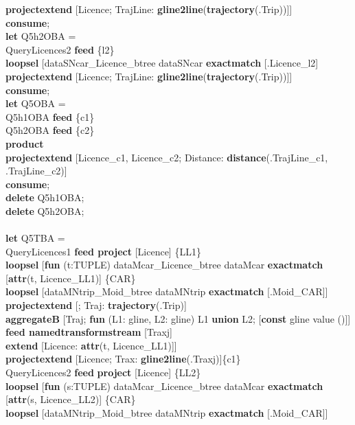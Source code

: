 \documentclass[a4paper]{article}
\newcommand{\op}[1]{\textbf{#1}}
\begin{document}
\begin{scriptsize}
\begin{tabbing}
\>\>\op{projectextend} [Licence; TrajLine: \op{gline2line}(\op{trajectory}(.Trip))]]\\
\op{consume};\\
\op{let} Q5h2OBA =\\
\>QueryLicences2 \op{feed} \{l2\}\\
\>\op{loopsel} [dataSNcar\_Licence\_btree dataSNcar \op{exactmatch} [.Licence\_l2]\\
\>\>\op{projectextend} [Licence; TrajLine: \op{gline2line}(\op{trajectory}(.Trip))]]\\
\op{consume};\\
\op{let} Q5OBA =\\
\>Q5h1OBA \op{feed} \{c1\}\\
\>Q5h2OBA \op{feed} \{c2\}\\
\>\op{product}\\
\>\op{projectextend} [Licence\_c1, Licence\_c2; Distance: \op{distance}(.TrajLine\_c1, .TrajLine\_c2)]\\
\op{consume};\\
\op{delete} Q5h1OBA;\\
\op{delete} Q5h2OBA;\\
\\
\op{let} Q5TBA =\\
\>QueryLicences1 \op{feed project} [Licence] \{LL1\}\\
\>\>\op{loopsel} [\op{fun} (t:TUPLE) dataMcar\_Licence\_btree dataMcar \op{exactmatch} [\op{attr}(t, Licence\_LL1)] \{CAR\}\\
\>\>\>\op{loopsel} [dataMNtrip\_Moid\_btree dataMNtrip \op{exactmatch} [.Moid\_CAR]]\\
\>\>\>\op{projectextend}  [; Traj: \op{trajectory}(.Trip)]\\
\>\>\>\op{aggregateB} [Traj; \op{fun} (L1: gline, L2: gline) L1 \op{union} L2; [\op{const} gline value ()]]\\
\>\>\>\op{feed namedtransformstream} [Traxj]\\
\>\>\>\op{extend} [Licence: \op{attr}(t, Licence\_LL1)]]\\
\>\>\op{projectextend} [Licence; Trax: \op{gline2line}(.Traxj)]\{c1\}\\
\>QueryLicences2 \op{feed} \op{project} [Licence] \{LL2\}\\
\>\>\op{loopsel} [\op{fun} (s:TUPLE) dataMcar\_Licence\_btree dataMcar \op{exactmatch} [\op{attr}(s, Licence\_LL2)] \{CAR\}\\
\>\>\>\op{loopsel} [dataMNtrip\_Moid\_btree dataMNtrip \op{exactmatch} [.Moid\_CAR]]\\

\end{tabbing}
\end{scriptsize}
\end{document}

